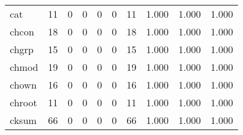 \begin{longtable}{lp{2.0cm}p{2.0cm}p{2.0cm}p{2.0cm}p{2.0cm}p{2.0cm}p{2.0cm}p{2.0cm}p{2.0cm}}
cat       &                     11 &                                             0 &                                            0 &                                           0 &                                            0 &                                         11 &                                1.000 &                                  1.000 &                                1.000 \\
chcon     &                     18 &                                             0 &                                            0 &                                           0 &                                            0 &                                         18 &                                1.000 &                                  1.000 &                                1.000 \\
chgrp     &                     15 &                                             0 &                                            0 &                                           0 &                                            0 &                                         15 &                                1.000 &                                  1.000 &                                1.000 \\
chmod     &                     19 &                                             0 &                                            0 &                                           0 &                                            0 &                                         19 &                                1.000 &                                  1.000 &                                1.000 \\
chown     &                     16 &                                             0 &                                            0 &                                           0 &                                            0 &                                         16 &                                1.000 &                                  1.000 &                                1.000 \\
chroot    &                     11 &                                             0 &                                            0 &                                           0 &                                            0 &                                         11 &                                1.000 &                                  1.000 &                                1.000 \\
cksum     &                     66 &                                             0 &                                            0 &                                           0 &                                            0 &                                         66 &                                1.000 &                                  1.000 &                                1.000 \\

\end{longtable}
